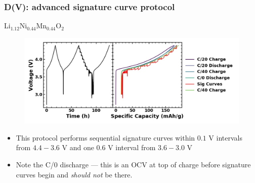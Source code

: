 \documentclass{beamer}
\begin{document}
\begin{frame}
\frametitle{D(V): advanced signature curve protocol}

\centering Li$_{1.12}$Ni$_{0.44}$Mn$_{0.44}$O$_2$
\vspace{-0.25cm}
\begin{figure}
	\includegraphics[width=0.85\linewidth]{figs/protocol_vis_Li112Ni44Mn44O2.jpg}
\end{figure}
\vspace{-0.5cm}
\begin{itemize}
	\item This protocol performs sequential signature curves within $0.1$ V intervals from $4.4-3.6$ V and one $0.6$ V interval from $3.6-3.0$ V
	\item Note the C/0 discharge --- this is an OCV at top of charge before signature curves begin and \emph{should not} be there.
\end{itemize}

\end{frame}
\end{document}
